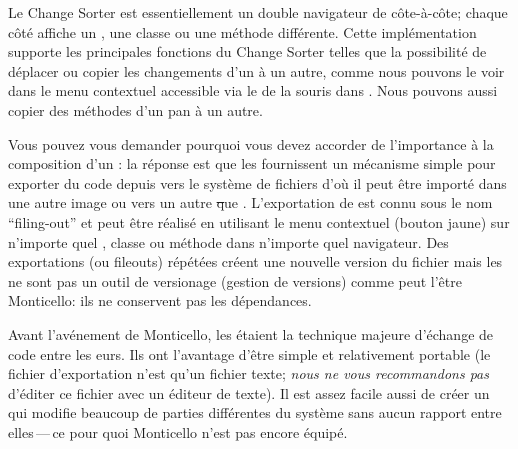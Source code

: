 \documentclass[a4paper,10pt,twoside]{book}
\begin{document}
Le Change Sorter est essentiellement un double navigateur de \changeset c\^ote-\`a-c\^ote;
chaque c\^ot\'e affiche un \changeset, une classe ou une m\'ethode diff\'erente.
Cette impl\'ementation supporte les principales fonctions du Change Sorter telles que
la possibilit\'e de d\'eplacer ou copier les changements d'un \changeset \`a un autre,
comme nous pouvons le voir dans le menu contextuel accessible via le 
de la souris dans .
Nous pouvons aussi copier des m\'ethodes d'un pan \`a un autre.

Vous pouvez vous demander pourquoi vous devez accorder de l'importance \`a la composition
d'un \changeset: la r\'eponse est que les \changesets fournissent un m\'ecanisme simple
pour exporter du code depuis \sq vers le syst\`eme de fichiers d'o\`u il peut
\^etre import\'e dans une autre image \sq ou vers un autre \st que \sq{}.
L'exportation de \changeset est connu sous le nom ``filing-out'' et peut \^etre r\'ealis\'e
en utilisant le menu contextuel (bouton jaune) sur n'importe quel \changeset, classe ou
m\'ethode dans n'importe quel navigateur.
Des exportations (ou fileouts) r\'ep\'et\'ees cr\'eent une nouvelle version du fichier
mais les \changesets ne sont pas un outil de versionage (gestion de
versions) comme peut l'\^etre Monticello:
ils ne conservent pas les d\'ependances.

Avant l'av\'enement de Monticello, les \changesets \'etaient la technique majeure d'\'echange de code entre les \sq{}eurs.
Ils ont l'avantage d'\^etre simple et relativement portable (le fichier d'exportation n'est qu'un fichier texte; 
\emph{nous ne vous recommandons pas} d'\'editer ce fichier avec un \'editeur de texte).
Il est assez facile aussi de cr\'eer un \changeset qui modifie
beaucoup de parties diff\'erentes du syst\`eme sans aucun rapport
entre elles\,---\,ce pour quoi Monticello n'est pas encore \'equip\'e.
\end{document}
